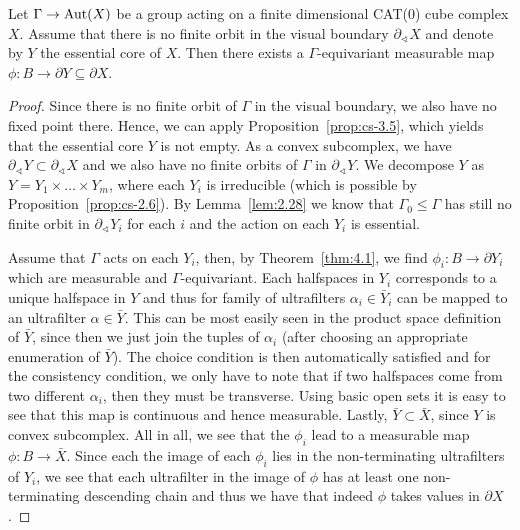 \begin{cor}[\cite{MR3509968}]
  Let \(\Gamma \to \operatorname{Aut}(X)\) be a group acting on a finite dimensional CAT(0) cube complex \(X\). Assume that there is no finite orbit in the visual boundary \(\partial_\sphericalangle X\) and denote by \(Y\) the essential core of \(X\). Then there exists a \(\Gamma\)-equivariant measurable map \(\phi \colon B \to \partial Y \subseteq \partial X\).
\end{cor}

\begin{proof}
  Since there is no finite orbit of \(\Gamma\) in the visual boundary, we also have no fixed point there. Hence, we can apply Proposition~\ref{prop:cs-3.5}, which yields that the essential core \(Y\) is not empty. As a convex subcomplex, we have \(\partial_\sphericalangle Y \subset \partial_\sphericalangle X\) and we also have no finite orbits of \(\Gamma\) in \(\partial_\sphericalangle Y\). We decompose \(Y\) as \(Y = Y_1 \times \dots \times Y_m\), where each \(Y_i\) is irreducible (which is possible by Proposition~\ref{prop:cs-2.6}). By Lemma~\ref{lem:2.28} we know that \(\Gamma_0 \leq \Gamma\) has still no finite orbit in \(\partial_\sphericalangle Y_i\) for each \(i\) and the action on each \(Y_i\) is essential.

  Assume that \(\Gamma\) acts on each \(Y_i\), then, by Theorem~\ref{thm:4.1}, we find \(\phi_i \colon B \to \partial Y_i\) which are measurable and \(\Gamma\)-equivariant. Each halfspaces in \(Y_i\) corresponds to a unique halfspace in \(Y\) and thus for family of ultrafilters \(\alpha_i \in \bar Y_i\) can be mapped to an ultrafilter \(\alpha \in \bar Y\). This can be most easily seen in the product space definition of \(\bar Y\), since then we just join the tuples of \(\alpha_i\) (after choosing an appropriate enumeration of \(\bar Y\)). The choice condition is then automatically satisfied and for the consistency condition, we only have to note that if two halfspaces come from two different \(\alpha_i\), then they must be transverse. Using basic open sets it is easy to see that this map is continuous and hence measurable. Lastly, \(\bar Y \subset \bar X\), since \(Y\) is convex subcomplex. All in all, we see that the \(\phi_i\) lead to a measurable map \(\phi\colon B \to \bar X\). Since each the image of each \(\phi_i\) lies in the non-terminating ultrafilters of \(Y_i\), we see that each ultrafilter in the image of \(\phi\) has at least one non-terminating descending chain and thus we have that indeed \(\phi\) takes values in \(\partial X\).
\end{proof}

